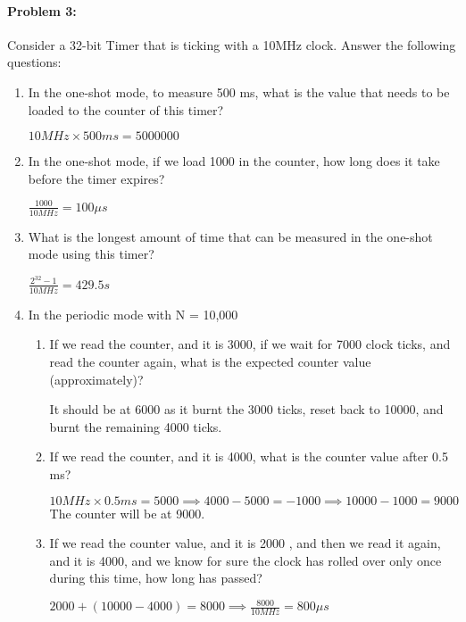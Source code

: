 \documentclass[12pt,letterpaper,titlepage]{article}
\begin{document}
\begin{raggedright}
\clearpage
\paragraph{Problem 3: }
Consider a 32-bit Timer that is ticking with a 10MHz clock. Answer the following questions:

\begin{enumerate}[label=\alph*)]
\item In the one-shot mode, to measure 500 ms, what is the value that needs to be loaded to the counter of this timer?

$10MHz \times 500ms = 5000000$

\item In the one-shot mode, if we load 1000 in the counter, how long does it take before the timer expires?

$\frac{1000}{10MHz} = 100\mu s$

\item What is the longest amount of time that can be measured in the one-shot mode using this timer?

$\frac{2^{32}-1}{10MHz} = 429.5s$

\item In the periodic mode with N = 10,000

\begin{enumerate}[label=\roman*)]
\item If we read the counter, and it is 3000, if we wait for 7000 clock ticks, and read the counter again, what is the expected counter value (approximately)?

It should be at 6000 as it burnt the 3000 ticks, reset back to 10000, and burnt the remaining 4000 ticks.

\item If we read the counter, and it is 4000, what is the counter value after 0.5 ms?

$10MHz \times 0.5ms = 5000\implies 4000 - 5000 = -1000 \implies 10000-1000=9000$ The counter will be at 9000.

\item If we read the counter value, and it is 2000 , and then we read it again, and it is 4000, and we know for sure the clock has rolled over only once during this time, how long has passed?

$2000 + (10000-4000) = 8000\implies \frac{8000}{10MHz} = 800\mu s$

\end{enumerate}
\end{enumerate}


\end{raggedright}
\end{document}
